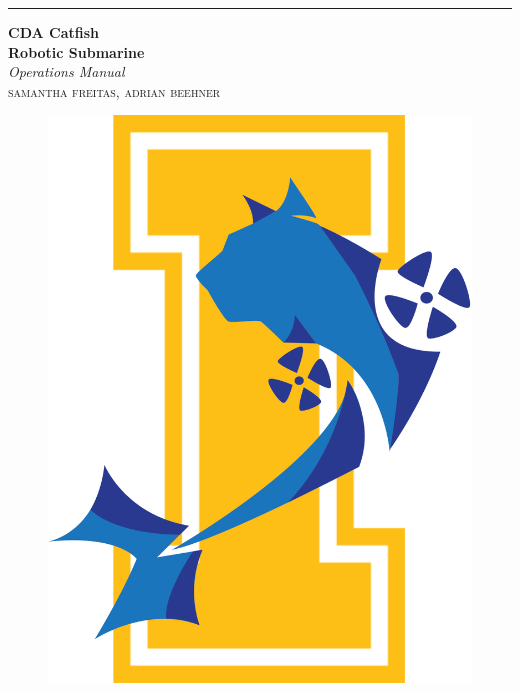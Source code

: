 \documentclass[a4paper, 18pt]{scrartcl} %
\newcommand\blankpage{%
	\null
	\thispagestyle{empty}%
	\addtocounter{page}{-2}%
	\newpage}
\begin{document}

\begin{titlepage} %
	
	\raggedleft %
	
	\rule{1pt}{\textheight} %
	\hspace{0.05\textwidth} %
	\parbox[b]{0.9\textwidth}{ %
		
		{\Huge\bfseries CDA Catfish
			 \\[0.5\baselineskip] Robotic Submarine}\\[2\baselineskip] %
		{\large\textit{Operations
		 Manual}}\\[4\baselineskip] %
		{\Large\textsc{samantha freitas, adrian beehner}} %
		
		\vspace{0.5\textheight} %
		
	}

\end{titlepage}

\blankpage
   
\blankpage

\begin{figure}[H]
	\hspace*{-2cm}
	\includegraphics[width=1.2\columnwidth]{Assets/Logos/New_Logov1.png}
\end{figure}
\end{document}
